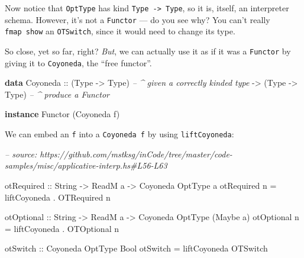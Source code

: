 \documentclass[]{article}
\newenvironment{Shaded}{}{}
\newcommand{\CommentTok}[1]{\textcolor[rgb]{0.38,0.63,0.69}{\textit{#1}}}
\newcommand{\DataTypeTok}[1]{\textcolor[rgb]{0.56,0.13,0.00}{#1}}
\newcommand{\FunctionTok}[1]{\textcolor[rgb]{0.02,0.16,0.49}{#1}}
\newcommand{\KeywordTok}[1]{\textcolor[rgb]{0.00,0.44,0.13}{\textbf{#1}}}
\newcommand{\NormalTok}[1]{#1}
\newcommand{\OtherTok}[1]{\textcolor[rgb]{0.00,0.44,0.13}{#1}}
\begin{document}
Now notice that \texttt{OptType} has kind \texttt{Type\ -\textgreater{}\ Type},
so it is, itself, an interpreter schema. However, it's not a \texttt{Functor}
--- do you see why? You can't really \texttt{fmap\ show} an \texttt{OTSwitch},
since it would need to change its type.

So close, yet so far, right? \emph{But}, we can actually use it as if it was a
\texttt{Functor} by giving it to \texttt{Coyoneda}, the ``free functor''.

\begin{Shaded}
\begin{Highlighting}[]
\KeywordTok{data} \DataTypeTok{Coyoneda}
\OtherTok{    ::}\NormalTok{ (}\DataTypeTok{Type} \OtherTok{->} \DataTypeTok{Type}\NormalTok{)       }\CommentTok{-- ^ given a correctly kinded type}
    \OtherTok{->}\NormalTok{ (}\DataTypeTok{Type} \OtherTok{->} \DataTypeTok{Type}\NormalTok{)       }\CommentTok{-- ^ produce a Functor}

\KeywordTok{instance} \DataTypeTok{Functor}\NormalTok{ (}\DataTypeTok{Coyoneda}\NormalTok{ f)}
\end{Highlighting}
\end{Shaded}

We can embed an \texttt{f} into a \texttt{Coyoneda\ f} by using
\texttt{liftCoyoneda}:

\begin{Shaded}
\begin{Highlighting}[]
\CommentTok{-- source: https://github.com/mstksg/inCode/tree/master/code-samples/misc/applicative-interp.hs#L56-L63}

\OtherTok{otRequired ::} \DataTypeTok{String} \OtherTok{->} \DataTypeTok{ReadM}\NormalTok{ a }\OtherTok{->} \DataTypeTok{Coyoneda} \DataTypeTok{OptType}\NormalTok{ a}
\NormalTok{otRequired n }\FunctionTok{=}\NormalTok{ liftCoyoneda }\FunctionTok{.} \DataTypeTok{OTRequired}\NormalTok{ n}

\OtherTok{otOptional ::} \DataTypeTok{String} \OtherTok{->} \DataTypeTok{ReadM}\NormalTok{ a }\OtherTok{->} \DataTypeTok{Coyoneda} \DataTypeTok{OptType}\NormalTok{ (}\DataTypeTok{Maybe}\NormalTok{ a)}
\NormalTok{otOptional n }\FunctionTok{=}\NormalTok{ liftCoyoneda }\FunctionTok{.} \DataTypeTok{OTOptional}\NormalTok{ n}

\OtherTok{otSwitch ::} \DataTypeTok{Coyoneda} \DataTypeTok{OptType} \DataTypeTok{Bool}
\NormalTok{otSwitch }\FunctionTok{=}\NormalTok{ liftCoyoneda }\DataTypeTok{OTSwitch}
\end{Highlighting}
\end{Shaded}
\end{document}
